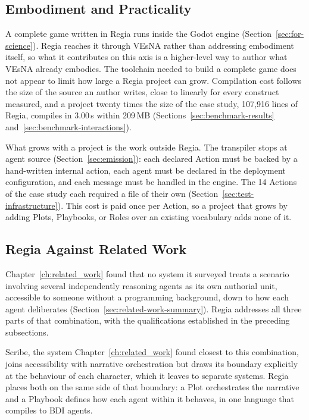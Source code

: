 \subsection{Embodiment and Practicality}
\label{sec:discussion-embodiment}

A complete game written in Regia runs inside the Godot engine (Section~\ref{sec:for-science}). Regia reaches it through VEsNA rather than addressing embodiment itself, so what it contributes on this axis is a higher-level way to author what VEsNA already embodies. The toolchain needed to build a complete game does not appear to limit how large a Regia project can grow. Compilation cost follows the size of the source an author writes, close to linearly for every construct measured, and a project twenty times the size of the case study, 107{,}916 lines of Regia, compiles in 3.00\,s within 209\,MB (Sections~\ref{sec:benchmark-results} and~\ref{sec:benchmark-interactions}). 

What grows with a project is the work outside Regia. The transpiler stops at agent source (Section~\ref{sec:emission}): each declared Action must be backed by a hand-written internal action, each agent must be declared in the deployment configuration, and each message must be handled in the engine. The 14 Actions of the case study each required a file of their own (Section~\ref{sec:test-infrastructure}). This cost is paid once per Action, so a project that grows by adding Plots, Playbooks, or Roles over an existing vocabulary adds none of it.

\subsection{Regia Against Related Work}
\label{sec:discussion-related-work}
 
Chapter~\ref{ch:related_work} found that no system it surveyed treats a scenario involving several independently reasoning agents as its own authorial unit, accessible to someone without a programming background, down to how each agent deliberates (Section~\ref{sec:related-work-summary}). Regia addresses all three parts of that combination, with the qualifications established in the preceding subsections.
 
Scribe, the system Chapter~\ref{ch:related_work} found closest to this combination, joins accessibility with narrative orchestration but draws its boundary explicitly at the behaviour of each character, which it leaves to separate systems. Regia places both on the same side of that boundary: a Plot orchestrates the narrative and a Playbook defines how each agent within it behaves, in one language that compiles to BDI agents.

